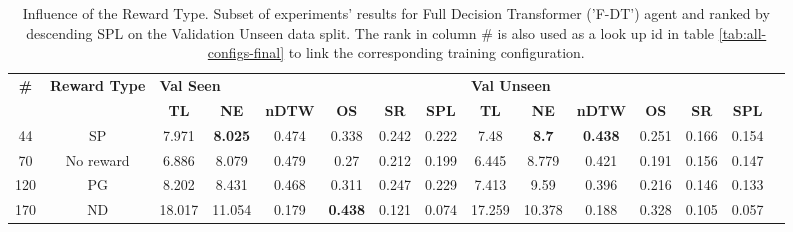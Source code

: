 \begin{table}
\centering
\caption{\label{tab:f_dt_reward_type}Influence of the Reward Type. Subset of experiments' results for Full Decision Transformer ('F-DT') agent and ranked by descending SPL on the Validation Unseen data split. The rank in column \# is also used as a look up id in table \ref{tab:all-configs-final} to link the corresponding training configuration.}
\begin{tabular}{@{\hskip3pt}c@{\hskip3pt}c@{\hskip3pt}c@{\hskip3pt}c@{\hskip3pt}c@{\hskip3pt}c@{\hskip3pt}c@{\hskip3pt}c@{\hskip3pt}c@{\hskip3pt}c@{\hskip3pt}c@{\hskip3pt}c@{\hskip3pt}c@{\hskip3pt}c@{\hskip3pt}c}
\toprule
\textbf{\#} & \textbf{Reward Type} & \multicolumn{6}{l}{\textbf{Val Seen}} & \multicolumn{6}{l}{\textbf{Val Unseen}} \\
 \textbf{~} &           \textbf{~} &       \textbf{TL} &     \textbf{NE} & \textbf{nDTW} &     \textbf{OS} & \textbf{SR} & \textbf{SPL} &         \textbf{TL} &   \textbf{NE} &   \textbf{nDTW} & \textbf{OS} & \textbf{SR} & \textbf{SPL} \\
\midrule
         44 &                   SP &             7.971 &  \textbf{8.025} &         0.474 &           0.338 &       0.242 &        0.222 &                7.48 &  \textbf{8.7} &  \textbf{0.438} &       0.251 &       0.166 &        0.154 \\
         70 &            No reward &             6.886 &           8.079 &         0.479 &            0.27 &       0.212 &        0.199 &               6.445 &         8.779 &           0.421 &       0.191 &       0.156 &        0.147 \\
        120 &                   PG &             8.202 &           8.431 &         0.468 &           0.311 &       0.247 &        0.229 &               7.413 &          9.59 &           0.396 &       0.216 &       0.146 &        0.133 \\
        170 &                   ND &            18.017 &          11.054 &         0.179 &  \textbf{0.438} &       0.121 &        0.074 &              17.259 &        10.378 &           0.188 &       0.328 &       0.105 &        0.057 \\
\bottomrule
\end{tabular}
\end{table}
